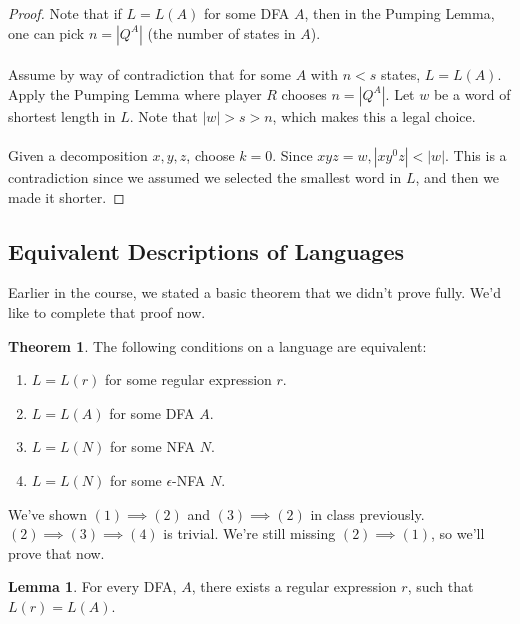 \documentclass[]{article}
\theoremstyle{definition}
\newtheorem*{theorem}{Theorem}
\newtheorem*{lemma}{Lemma}
\begin{document}
        \begin{proof}
          Note that if $L = L(A)$ for some DFA $A$, then in the Pumping Lemma, one can pick $n = |Q^A|$ (the number of states in $A$).
          \\ \\
          Assume by way of contradiction that for some $A$ with $n < s$ states, $L = L(A)$. Apply the Pumping Lemma where player $R$ chooses $n = |Q^A|$. Let $w$ be a word of shortest length in $L$. Note that $|w| > s > n$, which makes this a legal choice.
          \\ \\
          Given a decomposition $x, y, z$, choose $k = 0$. Since $xyz = w, |xy^0z| < |w|$. This is a contradiction since we assumed we selected the smallest word in $L$, and then we made it shorter.
        \end{proof}

      \subsection{Equivalent Descriptions of Languages}
        Earlier in the course, we stated a basic theorem that we didn't prove fully. We'd like to complete that proof now.

        \begin{theorem}
          The following conditions on a language are equivalent:
          \begin{enumerate}
            \item $L = L(r)$ for some regular expression $r$.
            \item $L = L(A)$ for some DFA $A$.
            \item $L = L(N)$ for some NFA $N$.
            \item $L = L(N)$ for some $\epsilon$-NFA $N$.
          \end{enumerate}
        \end{theorem}

        We've shown $(1) \implies (2)$ and $(3) \implies (2)$ in class previously. $(2) \implies (3) \implies (4)$ is trivial. We're still missing $(2) \implies (1)$, so we'll prove that now.

        \begin{lemma}
          For every DFA, $A$, there exists a regular expression $r$, such that $L(r) = L(A)$.
        \end{lemma}
\end{document}
